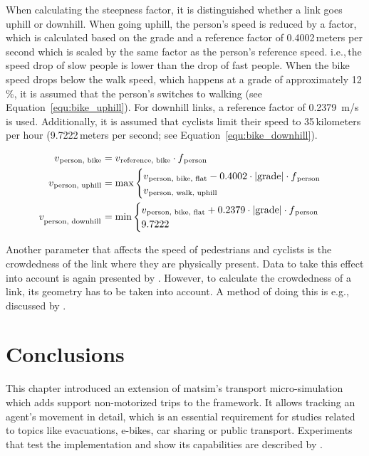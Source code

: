 When calculating the steepness factor, it is distinguished whether a link goes uphill or downhill. When going uphill, the person's speed is reduced by a factor, which is calculated based on the grade and a reference factor of 0.4002\,meters per second which is scaled by the same factor as the person's reference speed. i.e.,\,the speed drop of slow people is lower than the drop of fast people. When the bike speed drops below the walk speed, which happens at a grade of approximately 12\,\%, it is assumed that the person's switches to walking (see Equation~\ref{equ:bike_uphill}). For downhill links, a reference factor of 0.2379~m/s is used. Additionally, it is assumed that cyclists limit their speed to 35\,kilometers per hour (9.7222\,meters per second; see Equation~\ref{equ:bike_downhill}).

{\fontsize{12.8pt}{12}
\begin{align}
    v\textsubscript{person, bike} &= v\textsubscript{reference, bike} \cdot f\textsubscript{person}\\
    v\textsubscript{person, uphill} &= \text{max}
    \begin{cases}
        v\textsubscript{person, bike, flat} - 0.4002 \cdot |\text{grade}| \cdot f\textsubscript{person}\\
        v\textsubscript{person, walk, uphill}
    \end{cases}\label{equ:bike_uphill}\\
    v_{\textsubscript{person, downhill}} &= \text{min}
    \begin{cases}
        v\textsubscript{person, bike, flat} + 0.2379 \cdot |\text{grade}| \cdot f\textsubscript{person}\\
        9.7222
    \end{cases}\label{equ:bike_downhill}
\end{align}
}%

Another parameter that affects the speed of pedestrians and cyclists is the crowdedness of the link where they are physically present. Data to take this effect into account is again presented by \citet{Weidmann_TechRep_IVT_1992}. However, to calculate the crowdedness of a link, its geometry has to be taken into account. A method of doing this is e.g.,\,discussed by \citet{Laemmel_PhDThesis_2011}. 

\section{Conclusions}
This chapter introduced an extension of \gls{matsim}'s transport micro-simulation which adds support non-motorized trips to the framework. It allows tracking an agent's movement in detail, which is an essential requirement for studies related to topics like evacuations, e-bikes, car sharing or public transport. Experiments that test the implementation and show its capabilities are described by \citet{Dobler_PhDThesis_2013}.

